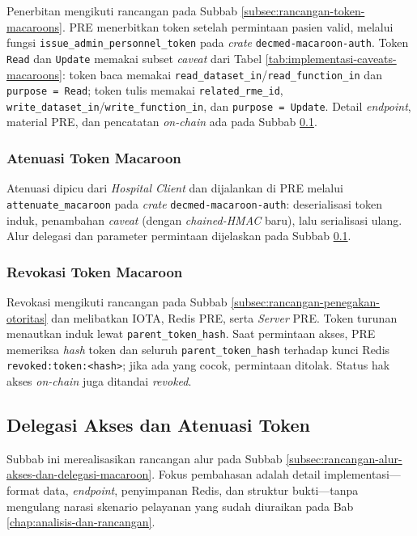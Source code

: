 \documentclass[bahasa, 12pt, a4paper, onecolumn, oneside, final]{report}
\begin{document}
Penerbitan mengikuti rancangan pada Subbab \ref{subsec:rancangan-token-macaroons}. PRE menerbitkan token setelah permintaan pasien valid, melalui fungsi \texttt{issue\_admin\_personnel\_token} pada \textit{crate} \texttt{decmed-macaroon-auth}. Token \texttt{Read} dan \texttt{Update} memakai subset \textit{caveat} dari Tabel \ref{tab:implementasi-caveats-macaroons}: token baca memakai \texttt{read\_dataset\_in}/\texttt{read\_function\_in} dan \texttt{purpose = Read}; token tulis memakai \texttt{related\_rme\_id}, \texttt{write\_dataset\_in}/\texttt{write\_function\_in}, dan \texttt{purpose = Update}. Detail \textit{endpoint}, material PRE, dan pencatatan \textit{on-chain} ada pada Subbab \ref{subsec:implementasi-atenuasi-offline-delegasi}.

\subsubsection{Atenuasi Token Macaroon}
\label{subsubsec:atenuasi-token-macaroons}

Atenuasi dipicu dari \textit{Hospital Client} dan dijalankan di PRE melalui \texttt{attenuate\_macaroon} pada \textit{crate} \texttt{decmed-macaroon-auth}: deserialisasi token induk, penambahan \textit{caveat} (dengan \textit{chained-HMAC} baru), lalu serialisasi ulang. Alur delegasi dan parameter permintaan dijelaskan pada Subbab \ref{subsec:implementasi-atenuasi-offline-delegasi}.

\subsubsection{Revokasi Token Macaroon}
\label{subsubsec:revokasi-token-macaroons}

Revokasi mengikuti rancangan pada Subbab \ref{subsec:rancangan-penegakan-otoritas} dan melibatkan IOTA, Redis PRE, serta \textit{Server} PRE. Token turunan menautkan induk lewat \texttt{parent\_token\_hash}. Saat permintaan akses, PRE memeriksa \textit{hash} token dan seluruh \texttt{parent\_token\_hash} terhadap kunci Redis \verb|revoked:token:<hash>|; jika ada yang cocok, permintaan ditolak. Status hak akses \textit{on-chain} juga ditandai \textit{revoked}.
\subsection{Delegasi Akses dan Atenuasi Token}
\label{subsec:implementasi-atenuasi-offline-delegasi}

Subbab ini merealisasikan rancangan alur pada Subbab \ref{subsec:rancangan-alur-akses-dan-delegasi-macaroon}. Fokus pembahasan adalah detail implementasi---format data, \textit{endpoint}, penyimpanan Redis, dan struktur bukti---tanpa mengulang narasi skenario pelayanan yang sudah diuraikan pada Bab \ref{chap:analisis-dan-rancangan}.
\end{document}
